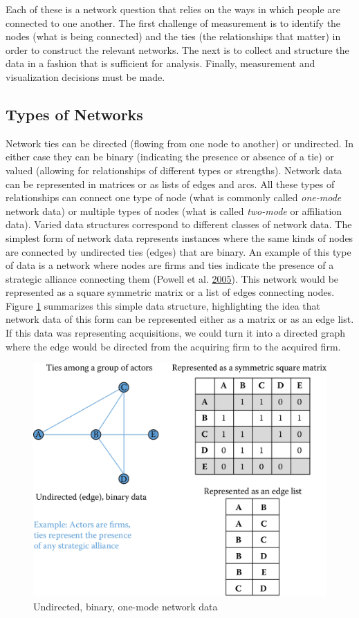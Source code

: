 \documentclass[]{krantz}
\begin{document}
Each of these is a network question that relies on the ways in which
people are connected to one another. The first challenge of measurement
is to identify the nodes (what is being connected) and the ties (the
relationships that matter) in order to construct the relevant networks.
The next is to collect and structure the data in a fashion that is
sufficient for analysis. Finally, measurement and visualization
decisions must be made.

\subsection{Types of Networks}\label{types-of-networks}

Network ties can be directed (flowing from one node to another) or
undirected. In either case they can be binary (indicating the presence
or absence of a tie) or valued (allowing for relationships of different
types or strengths). Network data can be represented in matrices or as
lists of edges and arcs. All these types of relationships can connect
one type of node (what is commonly called \emph{one-mode} network data)
or multiple types of nodes (what is called \emph{two-mode} or
affiliation data). Varied data structures correspond to different
classes of network data. The simplest form of network data represents
instances where the same kinds of nodes are connected by undirected ties
(edges) that are binary. An example of this type of data is a network
where nodes are firms and ties indicate the presence of a strategic
alliance connecting them (Powell et al.
\protect\hyperlink{ref-powell2005network}{2005}). This network would be
represented as a square symmetric matrix or a list of edges connecting
nodes. Figure \ref{fig:fig8-1} summarizes this simple data structure,
highlighting the idea that network data of this form can be represented
either as a matrix or as an edge list. If this data was representing
acquisitions, we could turn it into a directed graph where the edge
would be directed from the acquiring firm to the acquired firm.

\begin{figure}

{\centering \includegraphics[width=0.7\linewidth]{ChapterNetworks/figures/fig8-1} 

}

\caption{Undirected, binary, one-mode network data}\label{fig:fig8-1}
\end{figure}
\end{document}
